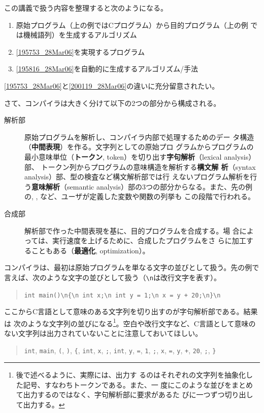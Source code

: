 この講義で扱う内容を整理すると次のようになる。
\begin{enumerate}
 \item 原始プログラム（上の例ではCプログラム）から目的プログラム（上の例
       では機械語列）を生成するアルゴリズム\label{195753_28Mar06}
 \item \ref{195753_28Mar06}を実現するプログラム
       \label{195816_28Mar06}
 \item \ref{195816_28Mar06}を自動的に生成するアルゴリズム/手法
       \label{200119_28Mar06}
\end{enumerate}
\ref{195753_28Mar06}と\ref{200119_28Mar06}の違いに充分留意されたい。

さて、コンパイラは大きく分けて以下の2つの部分から構成される。
\begin{description}
 \item[解析部] 原始プログラムを解析し、コンパイラ内部で処理するためのデー
	    タ構造（{\bfseries 中間表現}）を作る。文字列としての原始プロ
	    グラムからプログラムの最小意味単位（{\bfseries トークン},
	    token）を切り出す{\bfseries 字句解析}（lexical analysis）部、
	    トークン列からプログラムの意味構造を解析する{\bfseries 構文解
	    析}（syntax analysis）部、型の検査など構文解析部では行
	    えないプログラム解析を行う{\bfseries 意味解析}（semantic
	    analysis）部の3つの部分からなる。また、先の例の,
	    , など、ユーザが定義した変数や関数の列挙も
	    この段階で行われる。
 \item[合成部] 解析部で作った中間表現を基に、目的プログラムを合成する。場
	    合によっては、実行速度を上げるために、合成したプログラムをさ
	    らに加工することもある（{\bfseries 最適化}, optimization）。
\end{description}

コンパイラは、最初は原始プログラムを単なる文字の並びとして扱う。先の例で
言えば、次のような文字の並びとして扱う（\verb|\n|は改行文字を表す）。
\begin{quote}
\verb|int main()\n{\n int x;\n int y = 1;\n x = y + 20;\n}\n|
\end{quote}
ここからC言語として意味のある文字列を切り出すのが字句解析部である。結果は
次のような文字列の並びになる\footnote{後で述べるように、実際には、出力す
るのはそれぞれの文字列を抽象化した記号、すなわちトークンである。また、一
度にこのような並びをまとめて出力するのではなく、字句解析部に要求があるた
びに一つずつ切り出して出力する。}。空白や改行文字など、C言語として意味の
ない文字列は出力されていないことに注意しておいてほしい。
\begin{quote}
 \verb|int|, \verb|main|, \verb|(|, \verb|)|, \verb|{|, \verb|int|,
 \verb|x|, \verb|;|, \verb|int|, \verb|y|, \verb|=|, \verb|1|, 
 \verb|;|, \verb|x|, \verb|=|, \verb|y|, \verb|+|, \verb|20|, \verb|;|,
 \verb|}|
\end{quote}

